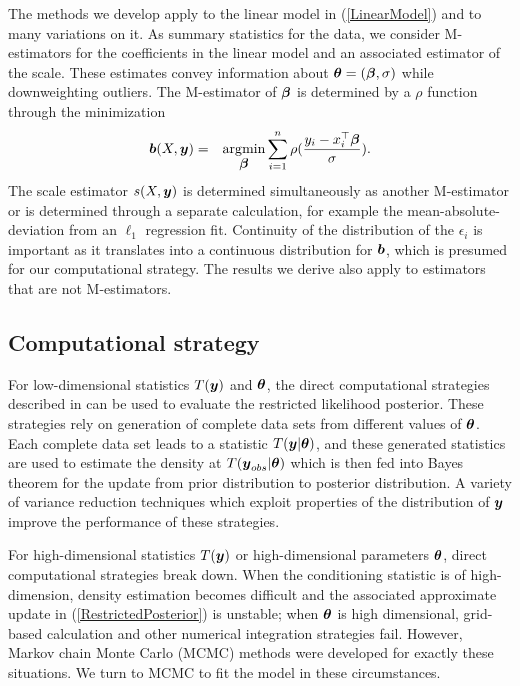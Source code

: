 \documentclass[12pt]{article}
\def\bth{\mbox{\boldmath $\theta$}}
\def\bbeta{\mbox{\boldmath $\beta$}}
\newcommand{\by}{\mbox{\boldmath $y$}}
\newcommand{\bb}{\mbox{\boldmath $b$}}
\DeclareMathOperator*{\argmin}{\arg\!\min}
\begin{document}
The methods we develop apply to the linear model in (\ref{LinearModel}) and to many variations
on it.  As summary statistics for the data, we consider M-estimators for the 
coefficients in the linear model and an associated 
estimator of the scale.  These estimates convey information about $\bth=(\bbeta,\sigma)$
while downweighting outliers.  The M-estimator of $\bbeta$ is determined by a $\rho$ function through the minimization
\begin{eqnarray}
\bb(X,\by) & = & \argmin_{\bbeta} \sum_{i=1}^n \rho(\frac{y_i - x_i^\top \bbeta}{\sigma}) .  
\end{eqnarray} 
The scale estimator $s(X,\by)$ is determined simultaneously as another M-estimator or is determined through
a separate calculation, for example the mean-absolute-deviation from an $\ell_1$ regression fit. 
Continuity of the distribution of the $\epsilon_i$ is important as it translates into a continuous distribution for $\bb$, 
which is presumed for our computational strategy.  The results we derive also apply to estimators that are
not M-estimators.  

\subsection{Computational strategy}
\label{highDim}
For low-dimensional statistics $T(\by)$ and $\bth$, the direct computational strategies described in \cite{lewis2012} can be used
to evaluate the restricted likelihood posterior.  
These strategies rely on generation of complete data sets from different values of $\bth$.  
Each complete data set leads to a statistic $T(\by|\bth)$, and these generated statistics are used to estimate the
density at $T(\by_{obs}|\bth)$
which is then fed into Bayes theorem for the update from prior distribution to posterior distribution.  
A variety of  variance reduction techniques which exploit 
properties of the distribution of $\by$ 
improve the performance of these strategies.  

For high-dimensional statistics $T(\by)$ or high-dimensional parameters $\bth$, direct computational 
strategies break down.  When the conditioning statistic is of high-dimension, density estimation becomes 
difficult and the associated approximate update in (\ref{RestrictedPosterior}) is unstable; when $\bth$
is high dimensional, grid-based calculation and other numerical integration strategies fail.  However, Markov 
chain Monte Carlo (MCMC) methods were developed for exactly these situations.  We turn to MCMC to 
fit the model in these circumstances.  
\end{document}
